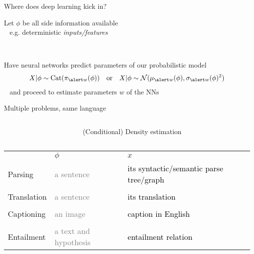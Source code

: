 \documentclass[14pt]{beamer}
\begin{document}
\begin{frame}{Where does deep learning kick in?}

Let $\phi$ be all side information available\\
~ e.g. deterministic \emph{inputs/features}

~

Have neural networks predict parameters of our probabilistic model
	\begin{align*}
    X|\phi \sim \Cat(\pi_{\alert w}(\phi)) & & \text{or} & & X|\phi \sim \mathcal N(\mu_{\alert w}(\phi), \sigma_{\alert w}(\phi)^2)
    \end{align*}
~ and proceed to \alert{estimate parameters} $w$ of the NNs %

 





\end{frame}



\begin{frame}{Multiple problems, same language}



\begin{small}

\begin{columns}
\begin{column}{0.3\textwidth}
\end{column}
\begin{column}{0.6\textwidth}
\alert{(Conditional) Density estimation}
\end{column}

\end{columns}

\begin{tabular}{p{2cm} p{4cm} p{4cm}}
 & $\phi$ & $x$ \\
Parsing &   \textcolor{gray}{a sentence} & \textcolor{black}{its syntactic/semantic parse tree/graph} \\
&&\\
Translation &  \textcolor{gray}{a sentence} & \textcolor{black}{its translation} \\
&&\\
Captioning &  \textcolor{gray}{an image} & \textcolor{black}{caption in English} \\
&&\\
Entailment  & \textcolor{gray}{a text and hypothesis} & \textcolor{black}{entailment relation}
\end{tabular}
\end{small}

\end{frame}
\end{document}

